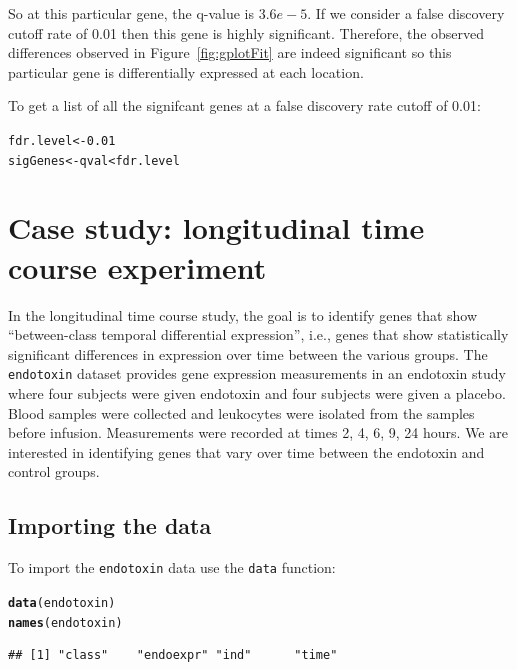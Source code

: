 \documentclass{article}\usepackage[]{graphicx}\usepackage[]{color}
\makeatletter
\newcommand{\hlnum}[1]{\textcolor[rgb]{0.686,0.059,0.569}{#1}}%
\newcommand{\hlopt}[1]{\textcolor[rgb]{0,0,0}{#1}}%
\newcommand{\hlstd}[1]{\textcolor[rgb]{0.345,0.345,0.345}{#1}}%
\newcommand{\hlkwb}[1]{\textcolor[rgb]{0.69,0.353,0.396}{#1}}%
\newcommand{\hlkwd}[1]{\textcolor[rgb]{0.737,0.353,0.396}{\textbf{#1}}}%
\newenvironment{kframe}{%
 \def\at@end@of@kframe{}%
 \ifinner\ifhmode%
  \def\at@end@of@kframe{\end{minipage}}%
  \begin{minipage}{\columnwidth}%
 \fi\fi%
 \def\FrameCommand##1{\hskip\@totalleftmargin \hskip-\fboxsep
 \colorbox{shadecolor}{##1}\hskip-\fboxsep
     \hskip-\linewidth \hskip-\@totalleftmargin \hskip\columnwidth}%
 \MakeFramed {\advance\hsize-\width
   \@totalleftmargin\z@ \linewidth\hsize
   \@setminipage}}%
 {\par\unskip\endMakeFramed%
 \at@end@of@kframe}
\newenvironment{knitrout}{}{} %
\makeatother
\begin{document}
So at this particular gene, the q-value is $3.6e-5$. If we consider a false discovery cutoff rate of 0.01 then this gene is highly significant. Therefore, the observed differences observed in Figure~\ref{fig:gplotFit} are indeed significant so this particular gene is differentially expressed at each location. 

To get a list of all the signifcant genes at a false discovery rate cutoff of 0.01:
\begin{knitrout}
\color{fgcolor}\begin{kframe}
\begin{alltt}
\hlstd{fdr.level} \hlkwb{<-} \hlnum{0.01}
\hlstd{sigGenes} \hlkwb{<-} \hlstd{qval} \hlopt{<} \hlstd{fdr.level}
\end{alltt}
\end{kframe}
\end{knitrout}

\section{Case study: longitudinal time course experiment}
\label{sec:endotoxin}
In the longitudinal time course study, the goal is to identify genes that show ``between-class temporal differential expression'', i.e., genes that show statistically significant differences in expression over time between the various groups. The {\tt endotoxin} dataset provides gene expression measurements in an endotoxin study where four subjects were given endotoxin and four subjects were given a placebo. Blood samples were collected and leukocytes were isolated from the samples before infusion. Measurements were recorded at times 2, 4, 6, 9, 24 hours. We are interested in identifying genes that vary over time between the endotoxin and control groups.

\subsection{Importing the data}
To import the {\tt endotoxin} data use the {\tt data} function:
\begin{knitrout}
\color{fgcolor}\begin{kframe}
\begin{alltt}
\hlkwd{data}\hlstd{(endotoxin)}
\hlkwd{names}\hlstd{(endotoxin)}
\end{alltt}
\begin{verbatim}
## [1] "class"    "endoexpr" "ind"      "time"
\end{verbatim}
\end{kframe}
\end{knitrout}
\end{document}
